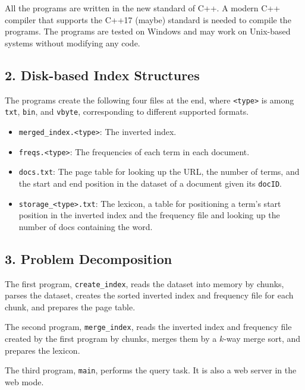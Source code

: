 \documentclass[12pt]{article}
\begin{document}
All the programs are written in the new standard of C++. A modern C++
compiler that supports the C++17 (maybe) standard is needed to compile
the programs. The programs are tested on Windows and may work on
Unix-based systems without modifying any code.

\hypertarget{2-disk-based-index-structures}{%
\subsection{2. Disk-based Index
Structures}\label{2-disk-based-index-structures}}

The programs create the following four files at the end, where
\texttt{\textless{}type\textgreater{}} is among \texttt{txt},
\texttt{bin}, and \texttt{vbyte}, corresponding to different supported
formats.

\begin{itemize}
\item
  \texttt{merged\_index.\textless{}type\textgreater{}}: The inverted
  index.
\item
  \texttt{freqs.\textless{}type\textgreater{}}: The frequencies of each
  term in each document.
\item
  \texttt{docs.txt}: The page table for looking up the URL, the number
  of terms, and the start and end position in the dataset of a document
  given its \texttt{docID}.
\item
  \texttt{storage\_\textless{}type\textgreater{}.txt}: The lexicon, a
  table for positioning a term's start position in the inverted index
  and the frequency file and looking up the number of docs containing
  the word.
\end{itemize}

\hypertarget{3-problem-decomposition}{%
\subsection{3. Problem Decomposition}\label{3-problem-decomposition}}

The first program, \texttt{create\_index}, reads the dataset into memory
by chunks, parses the dataset, creates the sorted inverted index and
frequency file for each chunk, and prepares the page table.

The second program, \texttt{merge\_index}, reads the inverted index and
frequency file created by the first program by chunks, merges them by a
\(k\)-way merge sort, and prepares the lexicon.

The third program, \texttt{main}, performs the query task. It is also a
web server in the web mode.
\end{document}
